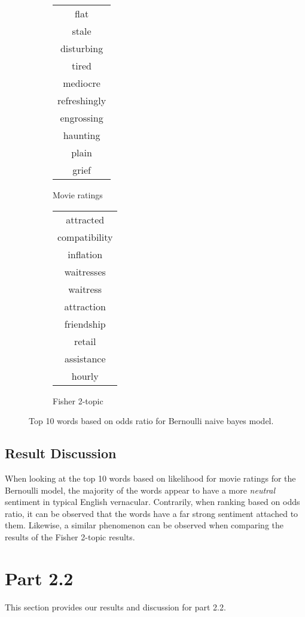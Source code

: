 \documentclass[10pt,a4paper]{article}
\begin{document}
\begin{figure}[H]
\centering
\begin{subfigure}{0.25\textwidth}
\begin{tabular}{|c|}
\hline
flat \\
stale \\
disturbing \\
tired \\
mediocre \\
refreshingly \\
engrossing \\
haunting \\
plain \\
grief \\
\hline
\end{tabular}
\caption{Movie ratings}
\end{subfigure}%
\begin{subfigure}{0.25\textwidth}
\begin{tabular}{|c|}
\hline
attracted \\
compatibility \\
inflation \\
waitresses \\
waitress \\ 
attraction \\
friendship \\
retail \\
assistance \\
hourly \\
\hline
\end{tabular}
\caption{Fisher 2-topic}
\end{subfigure}
\caption{Top 10 words based on odds ratio for Bernoulli naive bayes model.}
\end{figure}

\subsection{Result Discussion}
When looking at the top 10 words based on likelihood for movie ratings for the Bernoulli model, the majority of the words appear to have a more \emph{neutral} sentiment in typical English vernacular. Contrarily, when ranking based on odds ratio, it can be observed that the words have a far strong sentiment attached to them. Likewise, a similar phenomenon can be observed when comparing the results of the Fisher 2-topic results.

\section{Part 2.2}
This section provides our results and discussion for part 2.2.
\end{document}
